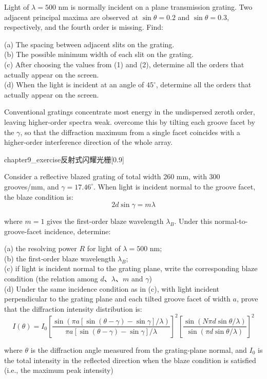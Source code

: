 \begin{example}
    Light of $\lambda = 500$ nm is normally incident on a plane transmission grating. Two adjacent principal maxima are observed at $\sin\theta = 0.2$ and $\sin\theta = 0.3$, respectively, and the fourth order is missing. Find:

    (a) The spacing between adjacent slits on the grating.\\
    (b) The possible minimum width of each slit on the grating.\\
    (c) After choosing the values from (1) and (2), determine all the orders that actually appear on the screen.\\
    (d) When the light is incident at an angle of $45^\circ$, determine all the orders that actually appear on the screen.
\end{example}

\begin{example}
    Conventional gratings concentrate most energy in the undispersed zeroth order, leaving higher-order spectra weak.  overcome this by tilting each groove facet by the  $\gamma$, so that the diffraction maximum from a single facet coincides with a higher-order interference direction of the whole array.

    \begin{singlefigure}{chapter9_exercise反射式闪耀光栅}[0.9]
    \end{singlefigure}

    Consider a reflective blazed grating of total width 260 mm, with 300 grooves/mm, and $\gamma = 17.46^\circ$. When light is incident normal to the groove facet, the blaze condition is:
    \[2d \sin\gamma = m \lambda\]

    where $m = 1$ gives the first-order blaze wavelength $\lambda_B$. Under this normal-to-groove-facet incidence, determine:

    (a) the resolving power $R$ for light of $\lambda = 500$ nm;\\
    (b) the first‑order blaze wavelength $\lambda_B$;\\
    (c) if light is incident normal to the grating plane, write the corresponding blaze condition (the relation among $d$、$\lambda$、$m$ and $\gamma$)\\
    (d) Under the same incidence condition as in (c), with light incident perpendicular to the grating plane and each tilted groove facet of width $a$, prove that the diffraction intensity distribution is:
    \[I(\theta) = I_0 \left[ \frac{\sin( \pi a [\sin(\theta-\gamma) - \sin\gamma]/\lambda)}{\pi a [\sin(\theta-\gamma) - \sin\gamma]/\lambda} \right]^2 \left[ \frac{\sin( N \pi d \sin\theta /\lambda)}{\sin(\pi d \sin\theta /\lambda)} \right]^2\]

    where $\theta$ is the diffraction angle measured from the grating‑plane normal, and $I_0$ is the total intensity in the reflected direction when the blaze condition is satisfied (i.e., the maximum peak intensity)
\end{example}

